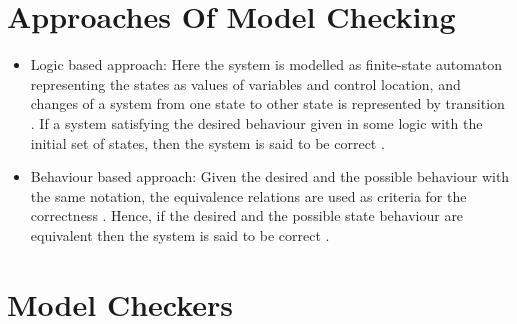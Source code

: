 \documentclass[a4paper,10pt]{report}
\begin{document}
\section{Approaches Of Model Checking}
\label{Appr to model check}

\begin{itemize}
\item Logic based approach: Here the system is modelled as finite-state automaton representing the states as values of variables and control location, and changes of a system from one state to other state is represented by transition \cite{DanielJackson}. If a system satisfying the desired behaviour given in some logic with the initial set of states, then the system is said to be correct \cite{DanielJackson}.
\item Behaviour based approach: Given the desired and the possible behaviour with the same notation, the equivalence relations are used as criteria for the correctness \cite{DanielJackson}. Hence, if the desired and the possible state behaviour are equivalent then the system is said to be correct \cite{DanielJackson}.  
\end{itemize}

\section{Model Checkers}
\end{document}
